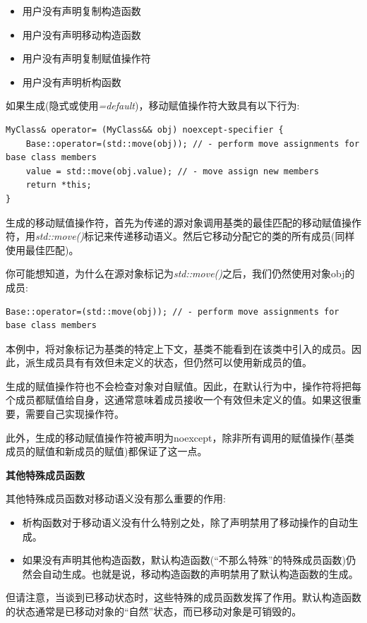 \begin{itemize}
	\item 用户没有声明复制构造函数
	\item 用户没有声明移动构造函数
	\item 用户没有声明复制赋值操作符
	\item 用户没有声明析构函数
\end{itemize}

如果生成(隐式或使用\textit{=default})，移动赋值操作符大致具有以下行为:\par

\begin{lstlisting}[caption={}]
MyClass& operator= (MyClass&& obj) noexcept-specifier {
	Base::operator=(std::move(obj)); // - perform move assignments for base class members
	value = std::move(obj.value); // - move assign new members
	return *this;
}
\end{lstlisting}

生成的移动赋值操作符，首先为传递的源对象调用基类的最佳匹配的移动赋值操作符，用\textit{std::move()}标记来传递移动语义。然后它移动分配它的类的所有成员(同样使用最佳匹配)。\par

你可能想知道，为什么在源对象标记为\textit{std::move()}之后，我们仍然使用对象obj的成员:\par

\begin{lstlisting}[caption={}]
Base::operator=(std::move(obj)); // - perform move assignments for base class members
\end{lstlisting}

本例中，将对象标记为基类的特定上下文，基类不能看到在该类中引入的成员。因此，派生成员具有有效但未定义的状态，但仍然可以使用新成员的值。\par

生成的赋值操作符也不会检查对象对自赋值。因此，在默认行为中，操作符将把每个成员都赋值给自身，这通常意味着成员接收一个有效但未定义的值。如果这很重要，需要自己实现操作符。\par

此外，生成的移动赋值操作符被声明为noexcept，除非所有调用的赋值操作(基类成员的赋值和新成员的赋值)都保证了这一点。\par

\hspace*{\fill} \par %
\textbf{其他特殊成员函数}

其他特殊成员函数对移动语义没有那么重要的作用:\par

\begin{itemize}
	\item 析构函数对于移动语义没有什么特别之处，除了声明禁用了移动操作的自动生成。
	\item 如果没有声明其他构造函数，默认构造函数(“不那么特殊”的特殊成员函数)仍然会自动生成。也就是说，移动构造函数的声明禁用了默认构造函数的生成。
\end{itemize}

但请注意，当谈到已移动状态时，这些特殊的成员函数发挥了作用。默认构造函数的状态通常是已移动对象的“自然”状态，而已移动对象是可销毁的。\par
















